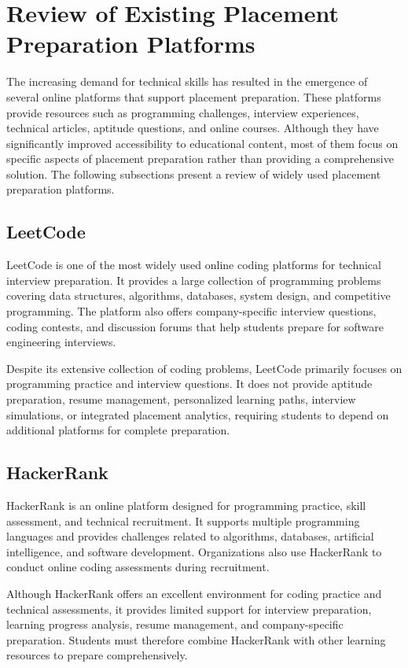 \section{Review of Existing Placement Preparation Platforms}

The increasing demand for technical skills has resulted in the emergence of several online platforms that support placement preparation. These platforms provide resources such as programming challenges, interview experiences, technical articles, aptitude questions, and online courses. Although they have significantly improved accessibility to educational content, most of them focus on specific aspects of placement preparation rather than providing a comprehensive solution. The following subsections present a review of widely used placement preparation platforms.

\subsection{LeetCode}

LeetCode is one of the most widely used online coding platforms for technical interview preparation. It provides a large collection of programming problems covering data structures, algorithms, databases, system design, and competitive programming. The platform also offers company-specific interview questions, coding contests, and discussion forums that help students prepare for software engineering interviews.

Despite its extensive collection of coding problems, LeetCode primarily focuses on programming practice and interview questions. It does not provide aptitude preparation, resume management, personalized learning paths, interview simulations, or integrated placement analytics, requiring students to depend on additional platforms for complete preparation.

\subsection{HackerRank}

HackerRank is an online platform designed for programming practice, skill assessment, and technical recruitment. It supports multiple programming languages and provides challenges related to algorithms, databases, artificial intelligence, and software development. Organizations also use HackerRank to conduct online coding assessments during recruitment.

Although HackerRank offers an excellent environment for coding practice and technical assessments, it provides limited support for interview preparation, learning progress analysis, resume management, and company-specific preparation. Students must therefore combine HackerRank with other learning resources to prepare comprehensively.

